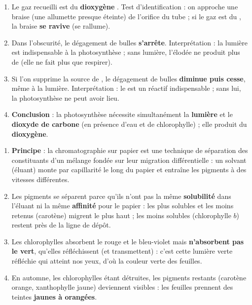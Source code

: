 \documentclass[11pt]{article}
\begin{document}
\begin{corrige}
\begin{enumerate}
\item Le gaz recueilli est du \textbf{dioxygène }. Test d'identification : on approche une braise (une allumette presque éteinte) de l'orifice du tube ; si le gaz est du , la braise \textbf{se ravive} (se rallume).
\item Dans l'obscurité, le dégagement de bulles \textbf{s'arrête}. Interprétation : la lumière est indispensable à la photosynthèse ; sans lumière, l'élodée ne produit plus de  (elle ne fait plus que respirer).
\item Si l'on supprime la source de , le dégagement de bulles \textbf{diminue puis cesse}, même à la lumière. Interprétation : le  est un réactif indispensable ; sans lui, la photosynthèse ne peut avoir lieu.
\item \textbf{Conclusion} : la photosynthèse nécessite simultanément la \textbf{lumière} et le \textbf{dioxyde de carbone} (en présence d'eau et de chlorophylle) ; elle produit du \textbf{dioxygène}.
\end{enumerate}
\end{corrige}

\begin{corrige}
\begin{enumerate}
\item \textbf{Principe} : la chromatographie sur papier est une technique de séparation des constituants d'un mélange fondée sur leur migration différentielle : un solvant (éluant) monte par capillarité le long du papier et entraîne les pigments à des vitesses différentes.
\item Les pigments se séparent parce qu'ils n'ont pas la même \textbf{solubilité} dans l'éluant ni la même \textbf{affinité} pour le papier : les plus solubles et les moins retenus (carotène) migrent le plus haut ; les moins solubles (chlorophylle $b$) restent près de la ligne de dépôt.
\item Les chlorophylles absorbent le rouge et le bleu-violet mais \textbf{n'absorbent pas le vert}, qu'elles réfléchissent (et transmettent) : c'est cette lumière verte réfléchie qui atteint nos yeux, d'où la couleur verte des feuilles.
\item En automne, les chlorophylles étant détruites, les pigments restants (carotène orange, xanthophylle jaune) deviennent visibles : les feuilles prennent des teintes \textbf{jaunes à orangées}.
\end{enumerate}
\end{corrige}
\end{document}
